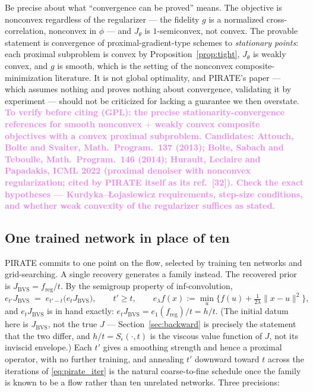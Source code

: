 \documentclass[11pt]{article}
\newcommand{\toverify}[1]{\textcolor{violet}{\textbf{#1}}}
\theoremstyle{definition}
\newcommand{\freg}{f_{\mathrm{reg}}}
\newcommand{\Jbvs}{J_{\mathrm{BVS}}}
\begin{document}
Be precise about what ``convergence can be proved'' means. The objective is nonconvex regardless of the regularizer — the fidelity $g$ is a normalized cross-correlation, nonconvex in $\phi$ — and $J_\theta$ is $1$-semiconvex, not convex. The provable statement is convergence of proximal-gradient-type schemes to \emph{stationary points}: each proximal subproblem is convex by Proposition~\ref{prop:tight}, $J_\theta$ is weakly convex, and $g$ is smooth, which is the setting of the nonconvex composite-minimization literature. It is not global optimality, and PIRATE's paper — which assumes nothing and proves nothing about convergence, validating it by experiment — should not be criticized for lacking a guarantee we then overstate. \toverify{To verify before citing (GPL): the precise stationarity-convergence references for smooth nonconvex $+$ weakly convex composite objectives with a convex proximal subproblem. Candidates: Attouch, Bolte and Svaiter, Math.\ Program.\ 137 (2013); Bolte, Sabach and Teboulle, Math.\ Program.\ 146 (2014); Hurault, Leclaire and Papadakis, ICML 2022 (proximal denoiser with nonconvex regularization; cited by PIRATE itself as its ref.\ [32]). Check the exact hypotheses — Kurdyka--\L{}ojasiewicz requirements, step-size conditions, and whether weak convexity of the regularizer suffices as stated.}

\subsection{One trained network in place of ten}
\label{sec:anneal}

PIRATE commits to one point on the flow, selected by training ten networks and grid-searching. A single recovery generates a family instead. The recovered prior is $\Jbvs = \freg/t$. By the semigroup property of inf-convolution,
\begin{equation}
\label{eq:semigroup}
e_{t'}\Jbvs \;=\; e_{t'-t}\big(e_t \Jbvs\big), \qquad t'\ge t, \qquad e_\lambda f(x) := \min_u\big\{f(u) + \tfrac{1}{2\lambda}\|x-u\|^2\big\},
\end{equation}
and $e_t\Jbvs$ is in hand exactly: $e_t\Jbvs = e_1(\freg)/t = h/t$. (The initial datum here is $\Jbvs$, not the true $J$ — Section~\ref{sec:backward} is precisely the statement that the two differ, and $h/t = S_\epsilon(\cdot,t)$ is the viscous value function of $J$, not its inviscid envelope.) Each $t'$ gives a smoothing strength and hence a proximal operator, with no further training, and annealing $t'$ downward toward $t$ across the iterations of \eqref{eq:pirate_iter} is the natural coarse-to-fine schedule once the family is known to be a flow rather than ten unrelated networks. Three precisions:
\end{document}
